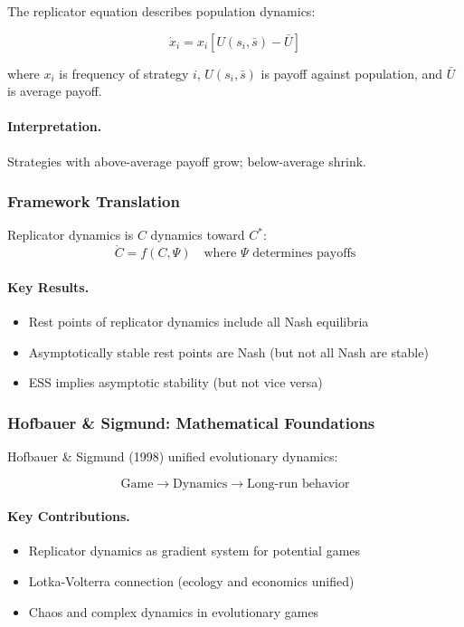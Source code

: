 The replicator equation describes population dynamics:

\begin{equation}
\boxed{
\dot{x}_i = x_i \left[ U(s_i, \bar{s}) - \bar{U} \right]
}
\label{eq:replicator}
\end{equation}

where $x_i$ is frequency of strategy $i$, $U(s_i, \bar{s})$ is payoff against 
population, and $\bar{U}$ is average payoff.

\paragraph{Interpretation.}
Strategies with above-average payoff grow; below-average shrink.

\subsubsection{Framework Translation}

Replicator dynamics is $C$ dynamics toward $C^*$:
\begin{equation}
\dot{C} = f(C, \Psi) \quad \text{where } \Psi \text{ determines payoffs}
\end{equation}

\paragraph{Key Results.}
\begin{itemize}
    \item Rest points of replicator dynamics include all Nash equilibria
    \item Asymptotically stable rest points are Nash (but not all Nash are stable)
    \item ESS implies asymptotic stability (but not vice versa)
\end{itemize}

\subsubsection{Hofbauer \& Sigmund: Mathematical Foundations}

Hofbauer \& Sigmund (1998) unified evolutionary dynamics:

\begin{equation}
\text{Game} \to \text{Dynamics} \to \text{Long-run behavior}
\end{equation}

\paragraph{Key Contributions.}
\begin{itemize}
    \item Replicator dynamics as gradient system for potential games
    \item Lotka-Volterra connection (ecology and economics unified)
    \item Chaos and complex dynamics in evolutionary games
\end{itemize}

